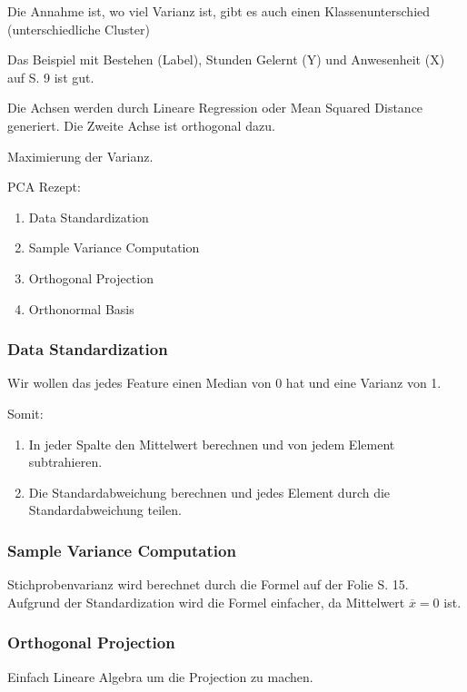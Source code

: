 \documentclass[a4paper]{article}
\begin{document}
Die Annahme ist, wo viel Varianz ist, gibt es auch einen Klassenunterschied (unterschiedliche Cluster)

Das Beispiel mit Bestehen (Label), Stunden Gelernt (Y) und Anwesenheit (X) auf S. 9 ist gut.

Die Achsen werden durch Lineare Regression oder Mean Squared Distance generiert. Die Zweite Achse ist orthogonal dazu. 

Maximierung der Varianz.

PCA Rezept:

\begin{enumerate}
    \item Data Standardization
    \item Sample Variance Computation
    \item Orthogonal Projection
    \item Orthonormal Basis
\end{enumerate}

\subsubsection{Data Standardization}

Wir wollen das jedes Feature einen Median von 0 hat und eine Varianz von 1.

Somit: 

\begin{enumerate}
    \item In jeder Spalte den Mittelwert berechnen und von jedem Element subtrahieren.
    \item Die Standardabweichung berechnen und jedes Element durch die Standardabweichung teilen.
\end{enumerate}

\subsubsection{Sample Variance Computation}

Stichprobenvarianz wird berechnet durch die Formel auf der Folie S. 15. Aufgrund der Standardization wird die Formel einfacher, da Mittelwert $\overline{x} = 0$ ist.


\subsubsection{Orthogonal Projection}

Einfach Lineare Algebra um die Projection zu machen.
\end{document}
